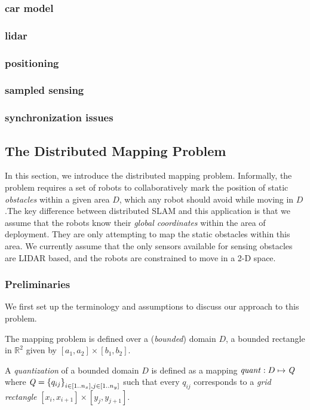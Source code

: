 \subsubsection{car model}
\subsubsection{lidar}
\subsubsection{positioning}
\subsubsection{sampled sensing}
\subsubsection{synchronization issues}

\subsection{The Distributed Mapping Problem}
In this section, we introduce the distributed mapping problem. Informally, the problem requires a set of robots to collaboratively mark the position of static \emph{obstacles} within a given area $D$, which any robot should avoid while moving in $D$.The key difference between distributed SLAM and this application is that we assume that the robots know their \emph{global coordinates} within the area of deployment. They are only attempting to map the static obstacles within this area. We currently assume that the only sensors available for sensing obstacles are LIDAR based, and the robots are constrained to move in a 2-D space.


\subsubsection{Preliminaries}
\label{sec:prelims}
We first set up the terminology and assumptions to discuss our approach to this problem.

The mapping problem is defined over a (\emph{bounded}) domain $D$, a bounded rectangle in $\mathbb{R}^2$ given by $[a_1,a_2]\times [b_1,b_2]$.

\begin{definition}
    A \emph{quantization} of a bounded domain $D$ is defined as a mapping $\mathit{quant}:D \mapsto \mathit{Q}$ where $\mathit{Q} = \left\{q_{ij}\right\}_{i\in [1..n_x], j\in [1..n_y]}$ such that every $q_{ij}$ corresponds to a \emph{grid rectangle} $[x_i, x_{i+1}] \times [y_j, y_{j+1}]$.
\end{definition}

